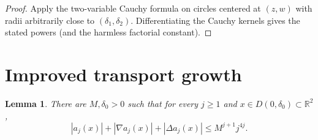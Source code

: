\documentclass[11pt]{article}
\newtheorem{lemma}{Lemma}
\begin{document}
\begin{proof}
Apply the two-variable Cauchy formula on circles centered at $(z,w)$ with
radii arbitrarily close to $(\delta_1,\delta_2)$.  Differentiating the Cauchy
kernels gives the stated powers (and the harmless factorial constant).
\end{proof}

\section{Improved transport growth}

\begin{lemma}\label{lem:transport}
There are $M,\delta_0>0$ such that for every $j\geq1$ and
$x\in D(0,\delta_0)\subset\mathbb R^2$,
\begin{equation}\label{eq:transport-bound}
 |a_j(x)|+|\nabla a_j(x)|+|\Delta a_j(x)|
 \leq M^{j+1}j^{4j}.
\end{equation}
\end{lemma}
\end{document}
